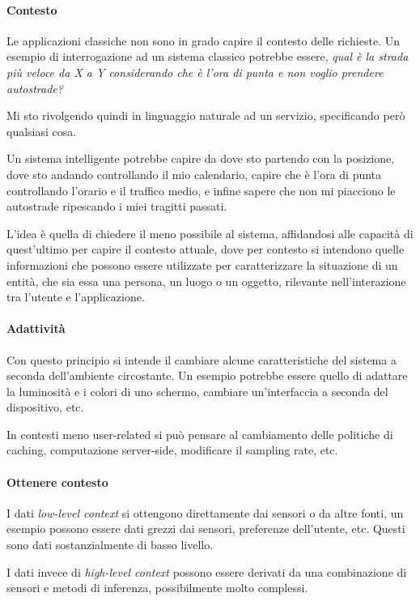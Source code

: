 \paragraph{Contesto}
Le applicazioni classiche non sono in grado capire il contesto delle richieste.
Un esempio di interrogazione ad un sistema classico 
potrebbe essere, \emph{qual è la strada più veloce da X a Y considerando 
che è l'ora di punta e non voglio prendere autostrade?}

Mi sto rivolgendo quindi in linguaggio naturale ad un servizio, specificando però 
qualsiasi cosa.

Un sistema intelligente potrebbe capire da dove sto partendo con la posizione, 
dove sto andando controllando il mio calendario, capire che è l'ora di punta controllando 
l'orario e il traffico medio, e infine sapere che non mi piacciono le autostrade 
ripescando i miei tragitti passati.

L'idea è quella di chiedere il meno possibile al sistema, affidandosi alle 
capacità di quest'ultimo per capire il contesto attuale, dove per contesto 
si intendono quelle informazioni che possono essere utilizzate per caratterizzare 
la situazione di un entità, che sia essa una persona, un luogo o un oggetto, rilevante 
nell'interazione tra l'utente e l'applicazione.

\paragraph{Adattività}
Con questo principio si intende il cambiare alcune caratteristiche del sistema 
a seconda dell'ambiente circostante. Un esempio potrebbe essere quello 
di adattare la luminosità e i colori di uno schermo, 
cambiare un'interfaccia a seconda del dispositivo, etc.

In contesti meno user-related si può pensare al cambiamento delle politiche di caching, 
computazione server-side, modificare il sampling rate, etc.

\paragraph{Ottenere contesto}
I dati \emph{low-level context} si ottengono direttamente dai sensori o da 
altre fonti, un esempio possono essere dati grezzi dai sensori, preferenze dell'utente, etc.
Questi sono dati sostanzialmente di basso livello.

I dati invece di \emph{high-level context} possono essere derivati da una combinazione di 
sensori e metodi di inferenza, possibilmente molto complessi.

